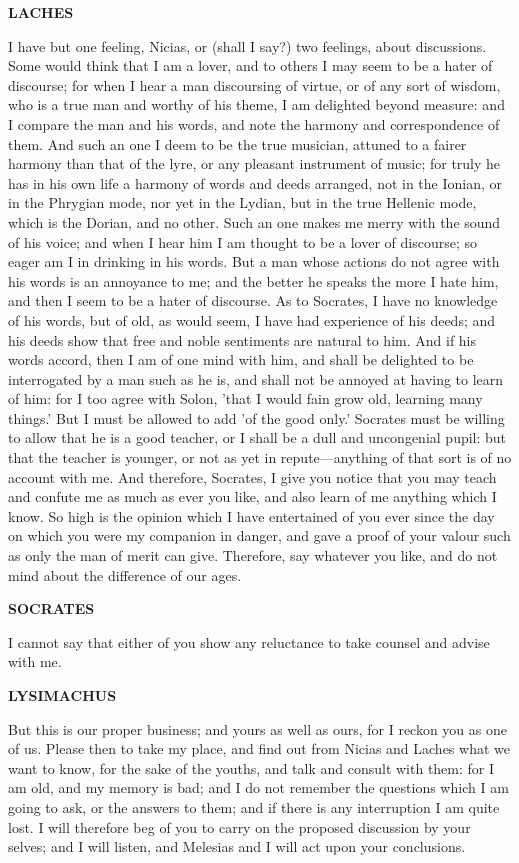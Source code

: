 \documentclass[11pt,letter]{book}
\begin{document}
\par \textbf{LACHES}
\par   I have but one feeling, Nicias, or (shall I say?) two feelings, about discussions. Some would think that I am a lover, and to others I may seem to be a hater of discourse; for when I hear a man discoursing of virtue, or of any sort of wisdom, who is a true man and worthy of his theme, I am delighted beyond measure:  and I compare the man and his words, and note the harmony and correspondence of them. And such an one I deem to be the true musician, attuned to a fairer harmony than that of the lyre, or any pleasant instrument of music; for truly he has in his own life a harmony of words and deeds arranged, not in the Ionian, or in the Phrygian mode, nor yet in the Lydian, but in the true Hellenic mode, which is the Dorian, and no other. Such an one makes me merry with the sound of his voice; and when I hear him I am thought to be a lover of discourse; so eager am I in drinking in his words. But a man whose actions do not agree with his words is an annoyance to me; and the better he speaks the more I hate him, and then I seem to be a hater of discourse. As to Socrates, I have no knowledge of his words, but of old, as would seem, I have had experience of his deeds; and his deeds show that free and noble sentiments are natural to him. And if his words accord, then I am of one mind with him, and shall be delighted to be interrogated by a man such as he is, and shall not be annoyed at having to learn of him:  for I too agree with Solon, 'that I would fain grow old, learning many things.' But I must be allowed to add 'of the good only.' Socrates must be willing to allow that he is a good teacher, or I shall be a dull and uncongenial pupil:  but that the teacher is younger, or not as yet in repute—anything of that sort is of no account with me. And therefore, Socrates, I give you notice that you may teach and confute me as much as ever you like, and also learn of me anything which I know. So high is the opinion which I have entertained of you ever since the day on which you were my companion in danger, and gave a proof of your valour such as only the man of merit can give. Therefore, say whatever you like, and do not mind about the difference of our ages.

\par \textbf{SOCRATES}
\par   I cannot say that either of you show any reluctance to take counsel and advise with me.

\par \textbf{LYSIMACHUS}
\par   But this is our proper business; and yours as well as ours, for I reckon you as one of us. Please then to take my place, and find out from Nicias and Laches what we want to know, for the sake of the youths, and talk and consult with them:  for I am old, and my memory is bad; and I do not remember the questions which I am going to ask, or the answers to them; and if there is any interruption I am quite lost. I will therefore beg of you to carry on the proposed discussion by your selves; and I will listen, and Melesias and I will act upon your conclusions.
\end{document}
